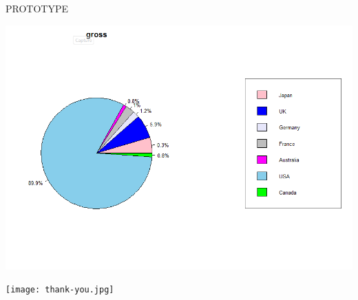 \documentclass[14pt]{beamer}
\begin{document}
\begin{frame}{PROTOTYPE}
  \begin{center}
    \includegraphics[scale=0.50]{pieGross.png}
  \end{center}
\end{frame}




\begin{frame}
  \begin{center}
    \texttt{[image: thank-you.jpg]}
  \end{center}
\end{frame}
\end{document}
